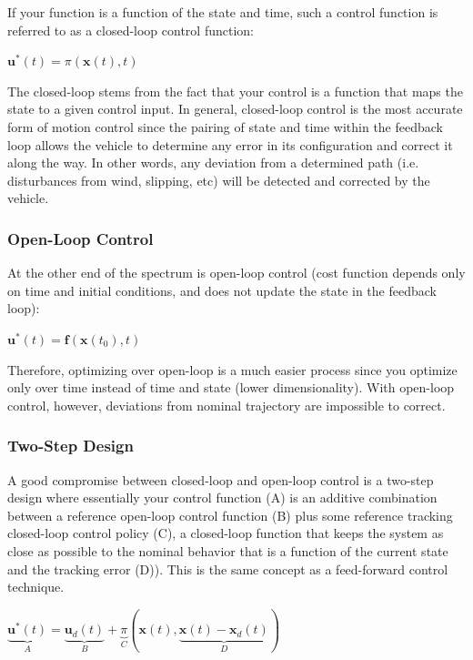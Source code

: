 \documentclass[twoside]{article}
\begin{document}
If your function is a function of the state and time, such a control function is referred to as a closed-loop control function: 

\begin{center}
$
\mathbf{u}^{*}(t)=\pi(\mathbf{x}(t),t)
$
\end{center}

The closed-loop stems from the fact that your control is a function that maps the state to a given control input. In general, closed-loop control is the most accurate form of motion control since the pairing of state and time within the feedback loop allows the vehicle to determine any error in its configuration and correct it along the way. In other words, any deviation from a determined path (i.e. disturbances from wind, slipping, etc) will be detected and corrected by the vehicle.

\subsubsection*{Open-Loop Control}

At the other end of the spectrum is open-loop control (cost function depends only on time and initial conditions, and does not update the state in the feedback loop):

\begin{center}
$
\mathbf{u}^{*}(t)=\mathbf{f}(\mathbf{x}(t_0),t)
$
\end{center}

Therefore, optimizing over open-loop is a much easier process since you optimize only over time instead of time and state (lower dimensionality). With open-loop control, however, deviations from nominal trajectory are impossible to correct.

\subsubsection*{Two-Step Design}

A good compromise between closed-loop and open-loop control is a two-step design where essentially your control function (A) is an additive combination between a reference open-loop control function (B) plus some reference tracking closed-loop control policy (C), a closed-loop function that keeps the system as close as possible to the nominal behavior that is a function of the current state and the tracking error (D)). This is the same concept as a feed-forward control technique.

\begin{center}
$
\underset{A}{\underbrace{\textbf{u}^*(t)}} = \underset{B}{\underbrace{\textbf{u}_d(t)}}+\underset{C}{\underbrace{\pi}}(\textbf{x}(t),\underset{D}{\underbrace{\mathbf{x}(t)-\mathbf{x}_d(t)}})
$
\end{center}
\end{document}
